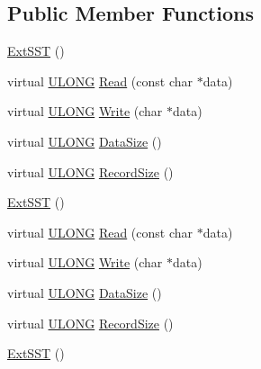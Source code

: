 \subsection*{Public Member Functions}
\begin{DoxyCompactItemize}
\item 
\hyperlink{struct_y_excel_1_1_workbook_1_1_ext_s_s_t_a28262d2aa0c78deea6035abd9696e5fd}{Ext\+S\+S\+T} ()
\item 
virtual \hyperlink{_basic_excel_8hpp_abe09d1bea023be6a07cbadde8e955435}{U\+L\+O\+N\+G} \hyperlink{struct_y_excel_1_1_workbook_1_1_ext_s_s_t_a34749d327ffe82b8328deb80988c9a9a}{Read} (const char $\ast$data)
\item 
virtual \hyperlink{_basic_excel_8hpp_abe09d1bea023be6a07cbadde8e955435}{U\+L\+O\+N\+G} \hyperlink{struct_y_excel_1_1_workbook_1_1_ext_s_s_t_a8c605ce99bd2de15af93081b20689886}{Write} (char $\ast$data)
\item 
virtual \hyperlink{_basic_excel_8hpp_abe09d1bea023be6a07cbadde8e955435}{U\+L\+O\+N\+G} \hyperlink{struct_y_excel_1_1_workbook_1_1_ext_s_s_t_a7f00127ffda01f555fa224c1579f4ab1}{Data\+Size} ()
\item 
virtual \hyperlink{_basic_excel_8hpp_abe09d1bea023be6a07cbadde8e955435}{U\+L\+O\+N\+G} \hyperlink{struct_y_excel_1_1_workbook_1_1_ext_s_s_t_a3dae64cd7f840a4be79fd158db92a051}{Record\+Size} ()
\item 
\hyperlink{struct_y_excel_1_1_workbook_1_1_ext_s_s_t_a28262d2aa0c78deea6035abd9696e5fd}{Ext\+S\+S\+T} ()
\item 
virtual \hyperlink{_basic_excel_8hpp_abe09d1bea023be6a07cbadde8e955435}{U\+L\+O\+N\+G} \hyperlink{struct_y_excel_1_1_workbook_1_1_ext_s_s_t_af5575fb5ef12f97b068b9d98e33397d2}{Read} (const char $\ast$data)
\item 
virtual \hyperlink{_basic_excel_8hpp_abe09d1bea023be6a07cbadde8e955435}{U\+L\+O\+N\+G} \hyperlink{struct_y_excel_1_1_workbook_1_1_ext_s_s_t_a950704f2181dca299308966429766e73}{Write} (char $\ast$data)
\item 
virtual \hyperlink{_basic_excel_8hpp_abe09d1bea023be6a07cbadde8e955435}{U\+L\+O\+N\+G} \hyperlink{struct_y_excel_1_1_workbook_1_1_ext_s_s_t_a7b5ee0b8ed5bb877c10ed47b8fa7d7ab}{Data\+Size} ()
\item 
virtual \hyperlink{_basic_excel_8hpp_abe09d1bea023be6a07cbadde8e955435}{U\+L\+O\+N\+G} \hyperlink{struct_y_excel_1_1_workbook_1_1_ext_s_s_t_a6bb8458025c7d378f0f9f35862e87e82}{Record\+Size} ()
\item 
\hyperlink{struct_y_excel_1_1_workbook_1_1_ext_s_s_t_a28262d2aa0c78deea6035abd9696e5fd}{Ext\+S\+S\+T} ()

\end{DoxyCompactItemize}
